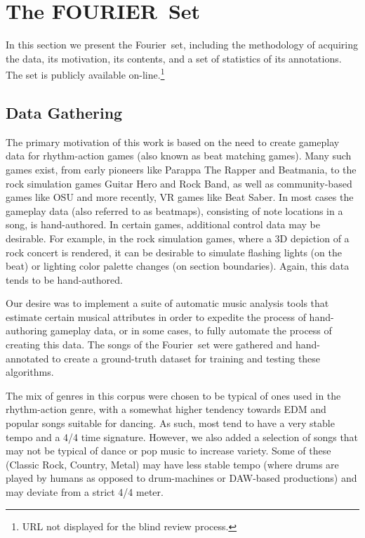 \documentclass{article}
\newcommand{\setNameUpper}{FOURIER}
\newcommand{\setName}{Fourier}
\begin{document}
\section{The \setNameUpper~Set}\label{sec:dataset}

In this section we present the \setName~set, including the methodology of acquiring the data, its motivation, its contents, and a set of statistics of its annotations.
The set is publicly available on-line.\footnote{URL not displayed for the blind review process.}

\subsection{Data Gathering}

The primary motivation of this work is based on the need to create gameplay data for rhythm-action games (also known as beat matching games). Many such games exist, from early pioneers like Parappa The Rapper and Beatmania, to the rock simulation games Guitar Hero and Rock Band, as well as community-based games like OSU and more recently, VR games like Beat Saber. In most cases the gameplay data (also referred to as beatmaps), consisting of note locations in a song, is hand-authored. In certain games, additional control data may be desirable. For example, in the rock simulation games, where a 3D depiction of a rock concert is rendered, it can be desirable to simulate flashing lights (on the beat) or lighting color palette changes (on section boundaries). Again, this data tends to be hand-authored.

Our desire was to implement a suite of automatic music analysis tools that estimate certain musical attributes in order to expedite the process of hand-authoring gameplay data, or in some cases, to fully automate the process of creating this data. The songs of the \setName~set were gathered and hand-annotated to create a ground-truth dataset for training and testing these algorithms.

The mix of genres in this corpus were chosen to be typical of ones used in the rhythm-action genre, with a somewhat higher tendency towards EDM and popular songs suitable for dancing. As such, most tend to have a very stable tempo and a 4/4 time signature. However, we also added a selection of songs that may not be typical of dance or pop music to increase variety. Some of these (Classic Rock, Country, Metal) may have less stable tempo (where drums are played by humans as opposed to drum-machines or DAW-based productions) and may deviate from a strict 4/4 meter. 
\end{document}
